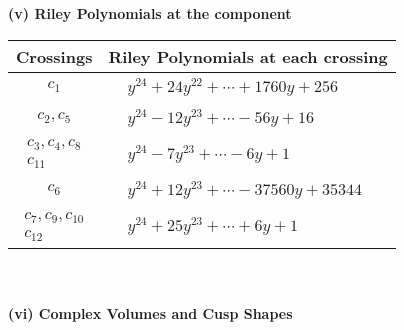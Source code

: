 \documentclass[1p]{elsarticle_modified}
\theoremstyle{definition}
\begin{document}
\newpage\renewcommand{\arraystretch}{1}
\flushleft \textbf{(v) Riley Polynomials at the component}\newline \\
\begin{tabular}{m{50pt}|m{274pt}}
Crossings & \hspace{64pt}Riley Polynomials at each crossing \\
\hline $$\begin{aligned}c_{1}\end{aligned}$$&$\begin{aligned}
&y^{24}+24 y^{22}+\cdots+1760 y+256
\end{aligned}$\\
\hline $$\begin{aligned}c_{2},c_{5}\end{aligned}$$&$\begin{aligned}
&y^{24}-12 y^{23}+\cdots-56 y+16
\end{aligned}$\\
\hline $$\begin{aligned}c_{3},c_{4},c_{8}\\c_{11}\end{aligned}$$&$\begin{aligned}
&y^{24}-7 y^{23}+\cdots-6 y+1
\end{aligned}$\\
\hline $$\begin{aligned}c_{6}\end{aligned}$$&$\begin{aligned}
&y^{24}+12 y^{23}+\cdots-37560 y+35344
\end{aligned}$\\
\hline $$\begin{aligned}c_{7},c_{9},c_{10}\\c_{12}\end{aligned}$$&$\begin{aligned}
&y^{24}+25 y^{23}+\cdots+6 y+1
\end{aligned}$\\
\hline
\end{tabular}\\~\\
\newpage\flushleft \textbf{(vi) Complex Volumes and Cusp Shapes}
\end{document}
